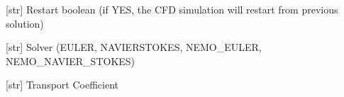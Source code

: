 \documentclass[letterpaper,10pt,english]{sphinxmanual}
\begin{document}
\begin{fulllineitems}
\begin{fulllineitems}
\end{fulllineitems}


\begin{fulllineitems}
\label{\detokenize{modules:su2.Solver.restart}}
\pysigstartsignatures
{}
\pysigstopsignatures
\sphinxAtStartPar
{[}str{]} Restart boolean (if YES, the CFD simulation will restart from previous solution)

\end{fulllineitems}


\begin{fulllineitems}
\label{\detokenize{modules:su2.Solver.solver}}
\pysigstartsignatures
{}
\pysigstopsignatures
\sphinxAtStartPar
{[}str{]} Solver (EULER, NAVIER\sphinxhyphen{}STOKES, NEMO\_EULER, NEMO\_NAVIER\_STOKES)

\end{fulllineitems}


\begin{fulllineitems}
\label{\detokenize{modules:su2.Solver.transport_coeff}}
\pysigstartsignatures
{}
\pysigstopsignatures
\sphinxAtStartPar
{[}str{]} Transport Coefficient

\end{fulllineitems}


\end{fulllineitems}

\end{document}
